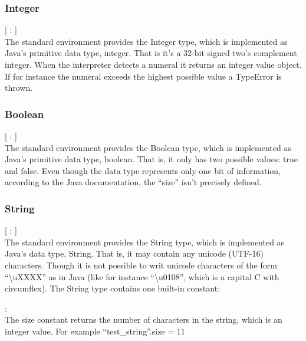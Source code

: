 \subsubsection{Integer}

\begin{dlist}
  \item {}[ : ]\\
The standard environment provides the Integer type, which is implemented as Java's primitive data type, integer. That is
it's a 32-bit signed two's complement integer. When the interpreter detects a numeral it returns an integer value object. If
for instance the numeral exceeds the highest possible value a TypeError is thrown.
\end{dlist}

\subsubsection{Boolean}

\begin{dlist}
  \item {}[ : ]\\
  The standard environment provides the Boolean type, which is implemented as Java's primitive data type, boolean. That is, it only has two possible values: true and false. Even though the data type represents only one bit of information, according to the Java documentation, the ``size'' isn't precisely defined. 
\end{dlist}

\subsubsection{String}
\begin{dlist}
  \item {}[ : ]\\
  The standard environment provides the String type, which is implemented as Java's data type, String. That is, it may contain any unicode (UTF-16) characters. Though it is not possible to writ unicode characters of the form ``\textbackslash{}uXXXX'' as in Java (like for instance ``\textbackslash{}u0108'', which is a capital C with circumflex). The String type contains one built-in constant:  
  \item {} : \\
  The size constant returns the number of characters in the string, which is an integer value. For example ``test\_string''.size = 11
\end{dlist}
